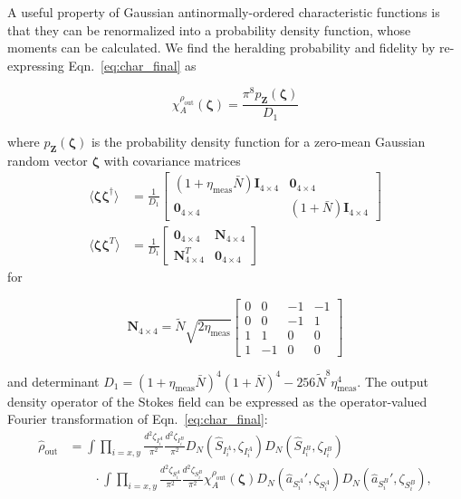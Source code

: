 \documentclass[aps,twocolumn,secnumarabic,amsmath,amssymb,pra,groupedaddress,
showpacs, showkeys]{revtex4-1}
\newcommand{\pna}[1]{\left(#1\right)}
\newcommand{\eqn}[1]{
\begin{equation}
	#1
\end{equation}
}
\begin{document}
A useful property of Gaussian antinormally-ordered characteristic functions is
that they can be renormalized into a probability density function, whose
moments can be calculated. We find the heralding probability and fidelity by
re-expressing Eqn.~\ref{eq:char_final} as
\eqn{
\chi_A^{\rho_{\textrm{out}}}\pna{\bm{\zeta}}=\frac{\pi^8 p_{\mathbf{Z}}\pna{\bm{\zeta}}}{D_1}
}
where $p_{\mathbf{Z}}\pna{\bm{\zeta}}$ is the probability density function for
a zero-mean Gaussian random vector $\bm{\zeta}$ with covariance matrices
\begin{align}
\langle \bm{\zeta}\bm{\zeta}^{\dagger}\rangle&=\frac{1}{D_1}\left[ 
\begin{array}{cc}
\pna{1+\eta_{\textrm{meas}} \bar{N}} \mathbf{I}_{4\times 4} &  \mathbf{0}_{4\times 4} \\
 \mathbf{0}_{4\times 4} & \pna{1+\bar{N}} \mathbf{I}_{4\times 4}
\end{array} 
\right] \nonumber \\
\langle \bm{\zeta}\bm{\zeta}^{T}\rangle&=\frac{1}{D_1}\left[ 
\begin{array}{cc}
 \mathbf{0}_{4\times 4} & \mathbf{N}_{4\times 4} \\
 \mathbf{N}_{4\times 4}^T & \mathbf{0}_{4\times 4}
\end{array} 
\right]\label{eq:chap3:moments}
\end{align}
for 
\eqn{
\mathbf{N}_{4\times 4}=\tilde{N}\sqrt{2\eta_{\textrm{meas}}}\left[ 
\begin{array}{cccc}
0 & 0 & -1 & -1\\
0 & 0 & -1 & 1\\
1 & 1 & 0 & 0\\
1 & -1 & 0 & 0
\end{array} 
\right]
}
and determinant $D_1=\pna{1+\eta_{\textrm{meas}} \bar{N}}^4
\pna{1+\bar{N}}^4-256 \tilde{N}^8 \eta_{\textrm{meas}}^4$. The output density
operator of the Stokes field can be expressed as the operator-valued Fourier
transformation of Eqn.~\ref{eq:char_final}:
\begin{align}
\hat{\rho}_{\textrm{out}}& =\int 
\prod_{i=x,y}
\frac{d^2 \zeta_{I_i^A}}{\pi^2} 
\frac{d^2 \zeta_{I_i^B}}{\pi^2} 
D_N\pna{\hat{S}_{I_i^A},\zeta_{I_i^A}} 
D_N\pna{\hat{S}_{I_i^B},\zeta_{I_i^B}}  \nonumber \\
& \qquad \cdot \int 
\prod_{i=x,y}
\frac{d^2 \zeta_{S_i^A}}{\pi^2} 
\frac{d^2 \zeta_{S_i^B}}{\pi^2}
\chi_A^{\rho_{\textrm{out}}}\pna{\bm{\zeta}} 
D_N\pna{\hat{a}_{S_i^A}',\zeta_{S_i^A}} 
D_N\pna{\hat{a}_{S_i^B}',\zeta_{S_i^B}},
\label{eq:fourier_char}
\end{align}
\end{document}
